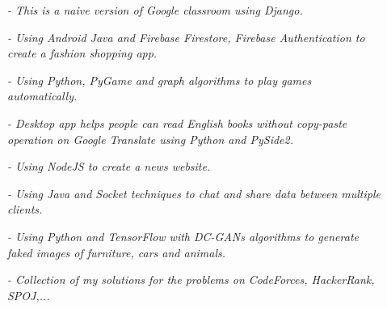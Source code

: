 \documentclass[a4paper,10pt]{article}
\begin{document}
\begin{adjustbox}{valign=t}
\begin{minipage}{0.6\textwidth}
\begin{description}
\item[{\textbf{\textcolor{ColorOne}{}}}] 
\textit{- This is a naive version of Google classroom using Django.}\\ \medskip 

\item[{\textbf{\textcolor{ColorOne}{}}}] 
\textit{- Using Android Java and Firebase Firestore, Firebase Authentication to create a fashion shopping app.}\\ \medskip 

\item[{\textbf{\textcolor{ColorOne}{}}}] 
\textit{- Using Python, PyGame and graph algorithms to play games automatically.}\\ \medskip 

\item[{\textbf{\textcolor{ColorOne}{}}}] 
\textit{- Desktop app helps people can read English books without copy-paste operation on Google Translate using Python and PySide2.}\\ \medskip 

\item[{\textbf{\textcolor{ColorOne}{}}}] 
\textit{- Using NodeJS to create a news website.}\\ \medskip 

\item[{\textbf{\textcolor{ColorOne}{}}}] 
\textit{- Using Java and Socket techniques to chat and share data between multiple clients.}\\ \medskip 

\item[{\textbf{\textcolor{ColorOne}{}}}] 
\textit{- Using Python and TensorFlow with DC-GANs algorithms to generate faked images of furniture, cars and animals.}\\ \medskip 

\item[{\textbf{\textcolor{ColorOne}{}}}] 
\textit{- Collection of my solutions for the problems on CodeForces, HackerRank, SPOJ,...}\\ \medskip 


\end{description}

\LastUpdate
\end{minipage}
\end{adjustbox}
\end{document}
